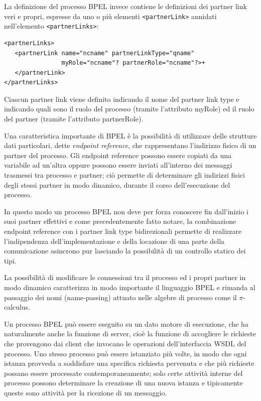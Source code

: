 La definizione del processo BPEL invece contiene le definizioni dei partner
link veri e propri, espresse da uno o più elementi \texttt{<partnerLink>}
annidati nell’elemento \texttt{<partnerLinks>}:

\begin{verbatim}
<partnerLinks>
   <partnerLink name="ncname" partnerLinkType="qname"
                myRole="ncname"? partnerRole="ncname"?>+
   </partnerLink>
</partnerLinks>
\end{verbatim}

Ciascun partner link viene definito indicando il nome del partner link type e
indicando quali sono il ruolo del processo (tramite l'attributo myRole) ed il
ruolo del partner (tramite l’attributo partnerRole).


Una caratteristica importante di BPEL è la possibilità di utilizzare delle
strutture dati particolari, dette \emph{endpoint reference}, che rappresentano
l'indirizzo fisico di un partner del processo. Gli endpoint reference possono
essere copiati da una variabile ad un'altra oppure possono essere inviati
all'interno dei messaggi trasmessi tra processo e partner; ciò permette di
determinare gli indirizzi fisici degli stessi partner in modo dinamico, durante il corso
dell'esecuzione del processo.

In questo modo un processo BPEL non deve per forza conoscere
fin dall'inizio i suoi partner effettivi e come precedentemente fatto notare,
la combinazione endpoint reference con i partner link type bidirezionali
permette di realizzare l'indipendenza dell'implementazione e della locazione di
una parte della comunicazione asincrono pur lasciando la possibilità di un
controllo statico dei tipi.

La possibilità di modificare le connessioni tra il processo ed i propri partner
in modo dinamico caratterizza in modo importante il linguaggio BPEL 
e rimanda al passaggio dei nomi (name-passing)
attuato nelle algebre di processo come il $\pi$-calculus.

Un processo BPEL può essere eseguito su un dato motore di esecuzione, che
ha naturalmente anche la funzione di server, cioè la funzione di accogliere le
richieste che provengono dai client che invocano le operazioni dell'interfaccia
WSDL del processo. Uno stesso processo può essere istanziato più volte, in
modo che ogni istanza provveda a soddisfare una specifica richiesta pervenuta
e che più richieste possano essere processate contemporaneamente; solo certe
attività interne del processo possono determinare la creazione di una nuova
istanza e tipicamente queste sono attività per la ricezione di un messaggio.

